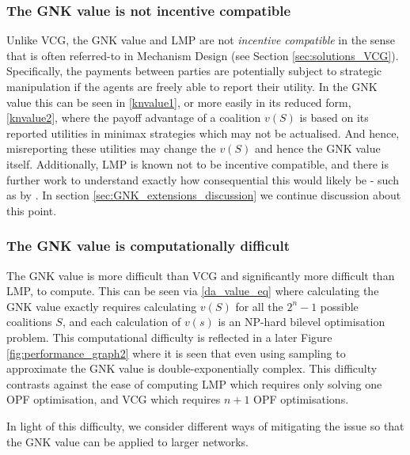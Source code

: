 \subsubsection*{The GNK value is not incentive compatible}
Unlike VCG, the GNK value and LMP are not \emph{incentive compatible} in the sense that is often referred-to in Mechanism Design (see Section \ref{sec:solutions_VCG}).
Specifically, the payments between parties are potentially subject to strategic manipulation if the agents are freely able to report their utility.
In the GNK value this can be seen in \eqref{knvalue1}, or more easily in its reduced form, \eqref{knvalue2}, where the payoff advantage of a coalition $v(S)$ is based on its reported utilities in minimax strategies which may not be actualised.
And hence, misreporting these utilities may change the $v(S)$ and hence the GNK value itself.
Additionally, LMP is known not to be incentive compatible, and there is further work to understand exactly how consequential this would likely be - such as by \cite{8054716}.
In section \ref{sec:GNK_extensions_discussion} we continue discussion about this point.

\subsubsection*{The GNK value is computationally difficult}
The GNK value is more difficult than VCG and significantly more difficult than LMP, to compute.
This can be seen via \eqref{da_value_eq} where calculating the GNK value exactly requires calculating $v(S)$ for all the $2^n-1$ possible coalitions $S$, and each calculation of $v(s)$ is an NP-hard bilevel optimisation problem.
This computational difficulty is reflected in a later Figure \ref{fig:performance_graph2} where it is seen that even using sampling to approximate the GNK value is double-exponentially complex. 
This difficulty contrasts against the ease of computing LMP which requires only solving one OPF optimisation, and VCG which requires $n+1$ OPF optimisations.

In light of this difficulty, we consider different ways of mitigating the issue so that the GNK value can be applied to larger networks.


